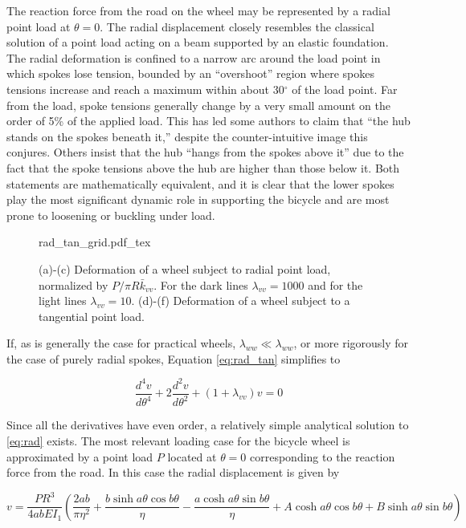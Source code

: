 \documentclass[../thesis.tex]{subfiles}
\newcommand{\dt}[2]{\frac{d^#2#1}{d\theta^#2}}
\begin{document}
The reaction force from the road on the wheel may be represented by a radial point load at $\theta=0$. The radial displacement closely resembles the classical solution of a point load acting on a beam supported by an elastic foundation\cite{Hetenyi}. The radial deformation is confined to a narrow arc around the load point in which spokes lose tension, bounded by an ``overshoot'' region where spokes tensions increase and reach a maximum within about 30$^{\circ}$ of the load point. Far from the load, spoke tensions generally change by a very small amount on the order of 5\% of the applied load. This has led some authors to claim that ``the hub stands on the spokes beneath it,'' despite the counter-intuitive image this conjures\cite{Brandt}. Others insist that the hub ``hangs from the spokes above it'' due to the fact that the spoke tensions above the hub are higher than those below it.  Both statements are mathematically equivalent, and it is clear that the lower spokes play the most significant dynamic role in supporting the bicycle and are most prone to loosening or buckling under load.

\begin{figure}
\label{fig:rad_tan_grid}
\centering
{}
{rad_tan_grid.pdf_tex}
\caption{(a)-(c) Deformation of a wheel subject to radial point load, normalized by $P/\pi R\bar{k}_{vv}$. For the dark lines $\lambda_{vv}=1000$ and for the light lines $\lambda_{vv}=10$. (d)-(f) Deformation of a wheel subject to a tangential point load.}
\end{figure}

If, as is generally the case for practical wheels, $\lambda_{ww} \ll \lambda_{ww}$, or more rigorously for the case of purely radial spokes, Equation \eqref{eq:rad_tan} simplifies to

\begin{equation}
\label{eq:rad}
\dt{v}{4} + 2\dt{v}{2} + (1+\lambda_{vv})v=0
\end{equation}

Since all the derivatives have even order, a relatively simple analytical solution to \eqref{eq:rad} exists. The most relevant loading case for the bicycle wheel is approximated by a point load $P$ located at $\theta=0$ corresponding to the reaction force from the road. In this case the radial displacement is given by

\begin{equation}
\label{eq:rad_soln}
v = \frac{PR^3}{4abEI_1} \left( \frac{2ab}{\pi\eta^2} + \frac{b\sinh{a\theta}\cos{b\theta}}{\eta} 
                               -\frac{a\cosh{a\theta}\sin{b\theta}}{\eta}
                               +A\cosh{a\theta}\cos{b\theta} + B\sinh{a\theta}\sin{b\theta}\right)
\end{equation}
\end{document}
